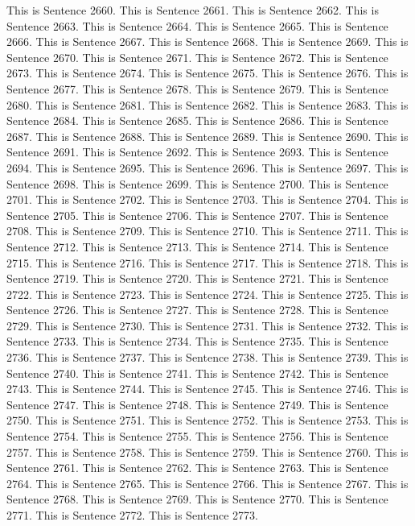 \documentclass{article}
\begin{document}
This is Sentence 2660.
This is Sentence 2661.
This is Sentence 2662.
This is Sentence 2663.
This is Sentence 2664.
This is Sentence 2665.
This is Sentence 2666.
This is Sentence 2667.
This is Sentence 2668.
This is Sentence 2669.
This is Sentence 2670.
This is Sentence 2671.
This is Sentence 2672.
This is Sentence 2673.
This is Sentence 2674.
This is Sentence 2675.
This is Sentence 2676.
This is Sentence 2677.
This is Sentence 2678.
This is Sentence 2679.
This is Sentence 2680.
This is Sentence 2681.
This is Sentence 2682.
This is Sentence 2683.
This is Sentence 2684.
This is Sentence 2685.
This is Sentence 2686.
This is Sentence 2687.
This is Sentence 2688.
This is Sentence 2689.
This is Sentence 2690.
This is Sentence 2691.
This is Sentence 2692.
This is Sentence 2693.
This is Sentence 2694.
This is Sentence 2695.
This is Sentence 2696.
This is Sentence 2697.
This is Sentence 2698.
This is Sentence 2699.
This is Sentence 2700.
This is Sentence 2701.
This is Sentence 2702.
This is Sentence 2703.
This is Sentence 2704.
This is Sentence 2705.
This is Sentence 2706.
This is Sentence 2707.
This is Sentence 2708.
This is Sentence 2709.
This is Sentence 2710.
This is Sentence 2711.
This is Sentence 2712.
This is Sentence 2713.
This is Sentence 2714.
This is Sentence 2715.
This is Sentence 2716.
This is Sentence 2717.
This is Sentence 2718.
This is Sentence 2719.
This is Sentence 2720.
This is Sentence 2721.
This is Sentence 2722.
This is Sentence 2723.
This is Sentence 2724.
This is Sentence 2725.
This is Sentence 2726.
This is Sentence 2727.
This is Sentence 2728.
This is Sentence 2729.
This is Sentence 2730.
This is Sentence 2731.
This is Sentence 2732.
This is Sentence 2733.
This is Sentence 2734.
This is Sentence 2735.
This is Sentence 2736.
This is Sentence 2737.
This is Sentence 2738.
This is Sentence 2739.
This is Sentence 2740.
This is Sentence 2741.
This is Sentence 2742.
This is Sentence 2743.
This is Sentence 2744.
This is Sentence 2745.
This is Sentence 2746.
This is Sentence 2747.
This is Sentence 2748.
This is Sentence 2749.
This is Sentence 2750.
This is Sentence 2751.
This is Sentence 2752.
This is Sentence 2753.
This is Sentence 2754.
This is Sentence 2755.
This is Sentence 2756.
This is Sentence 2757.
This is Sentence 2758.
This is Sentence 2759.
This is Sentence 2760.
This is Sentence 2761.
This is Sentence 2762.
This is Sentence 2763.
This is Sentence 2764.
This is Sentence 2765.
This is Sentence 2766.
This is Sentence 2767.
This is Sentence 2768.
This is Sentence 2769.
This is Sentence 2770.
This is Sentence 2771.
This is Sentence 2772.
This is Sentence 2773.
\end{document}
